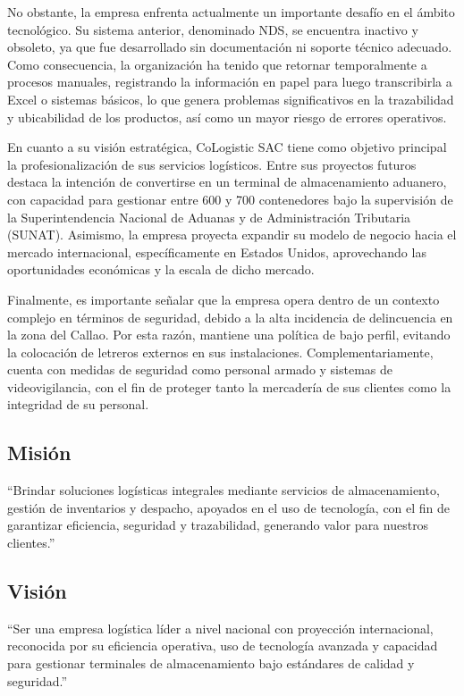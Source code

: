 \documentclass[11pt]{article}
\begin{document}
No obstante, la empresa enfrenta actualmente un importante desafío en el
ámbito tecnológico. Su sistema anterior, denominado NDS, se encuentra
inactivo y obsoleto, ya que fue desarrollado sin documentación ni
soporte técnico adecuado. Como consecuencia, la organización ha tenido
que retornar temporalmente a procesos manuales, registrando la
información en papel para luego transcribirla a Excel o sistemas
básicos, lo que genera problemas significativos en la trazabilidad y
ubicabilidad de los productos, así como un mayor riesgo de errores
operativos.

En cuanto a su visión estratégica, CoLogistic SAC tiene como objetivo
principal la profesionalización de sus servicios logísticos. Entre sus
proyectos futuros destaca la intención de convertirse en un terminal de
almacenamiento aduanero, con capacidad para gestionar entre 600 y 700
contenedores bajo la supervisión de la Superintendencia Nacional de
Aduanas y de Administración Tributaria (SUNAT). Asimismo, la empresa
proyecta expandir su modelo de negocio hacia el mercado internacional,
específicamente en Estados Unidos, aprovechando las oportunidades
económicas y la escala de dicho mercado.

Finalmente, es importante señalar que la empresa opera dentro de un
contexto complejo en términos de seguridad, debido a la alta incidencia
de delincuencia en la zona del Callao. Por esta razón, mantiene una
política de bajo perfil, evitando la colocación de letreros externos en
sus instalaciones. Complementariamente, cuenta con medidas de seguridad
como personal armado y sistemas de videovigilancia, con el fin de
proteger tanto la mercadería de sus clientes como la integridad de su
personal.

\subsection{Misión}

``Brindar soluciones logísticas integrales mediante servicios de
almacenamiento, gestión de inventarios y despacho, apoyados en el uso de
tecnología, con el fin de garantizar eficiencia, seguridad y
trazabilidad, generando valor para nuestros clientes.''

\subsection{Visión}

``Ser una empresa logística líder a nivel nacional con proyección
internacional, reconocida por su eficiencia operativa, uso de tecnología
avanzada y capacidad para gestionar terminales de almacenamiento bajo
estándares de calidad y seguridad.''
\end{document}
